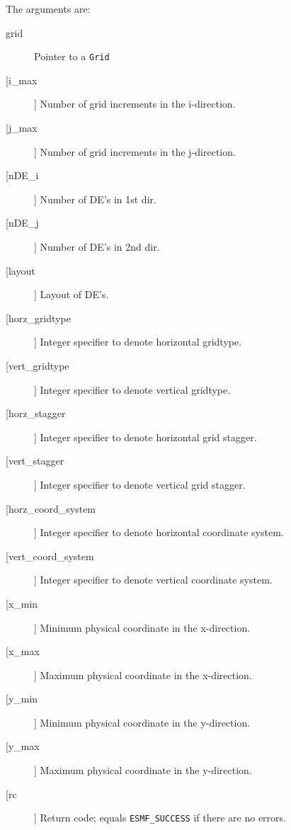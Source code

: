        The arguments are:
       \begin{description}
       \item[grid]
            Pointer to a {\tt Grid}
       \item[[i\_max]]
            Number of grid increments in the i-direction.
       \item[[j\_max]]
            Number of grid increments in the j-direction.
       \item[[nDE\_i]]
            Number of DE's in 1st dir.
       \item[[nDE\_j]]
            Number of DE's in 2nd dir.
       \item[[layout]]
           Layout of DE's.
       \item[[horz\_gridtype]]
            Integer specifier to denote horizontal gridtype.
       \item[[vert\_gridtype]]
            Integer specifier to denote vertical gridtype.
       \item[[horz\_stagger]]
            Integer specifier to denote horizontal grid stagger.
       \item[[vert\_stagger]]
            Integer specifier to denote vertical grid stagger.
       \item[[horz\_coord\_system]]
            Integer specifier to denote horizontal coordinate system.
       \item[[vert\_coord\_system]]
            Integer specifier to denote vertical coordinate system.
       \item[[x\_min]]
            Minimum physical coordinate in the x-direction.
       \item[[x\_max]]
            Maximum physical coordinate in the x-direction.
       \item[[y\_min]]
            Minimum physical coordinate in the y-direction.
       \item[[y\_max]]
            Maximum physical coordinate in the y-direction.
       \item[[rc]]
            Return code; equals {\tt ESMF\_SUCCESS} if there are no errors.
       \end{description}
  
\begin{verbatim} \end{verbatim}
 
 
\mbox{}\hrulefill\ 
 
